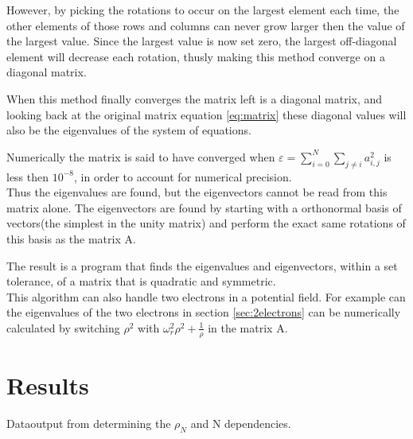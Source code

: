 \documentclass[11pt,a4paper,notitlepage]{article}
\begin{document}
However, by picking the rotations to occur on the largest element each time,
the other elements of those rows and columns can never grow larger then the value of the largest value. Since the largest value is now set zero, the largest off-diagonal element will decrease each rotation, thusly making this method converge on a diagonal matrix. 

When this method finally converges the matrix left is a diagonal matrix, and looking back at the original matrix equation \eqref{eq:matrix} these diagonal values will also be the eigenvalues of the system of equations.

Numerically the matrix is said to have converged when $\varepsilon = \sum_{i=0}^N \sum_{j\neq i} a_{i,j}^2$ is less then $10^{-8}$, in order to account for numerical precision. \\

Thus the eigenvalues are found, but the eigenvectors cannot be read from this matrix alone. The eigenvectors are found by starting with a orthonormal basis of vectors(the simplest in the unity matrix) and perform the exact same rotations of this basis as the matrix A.

The result is a program that finds the eigenvalues and eigenvectors, within a set tolerance, of a matrix that is quadratic and symmetric. \\

This algorithm can also handle two electrons in a potential field. For example can the eigenvalues of the two electrons in section \ref{sec:2electrons} can be numerically calculated by switching $\rho^2$ with $\omega_r^2\rho^2 + \frac{1}{\rho}$ in the matrix A.

\section{Results} \label{sec:results}
Dataoutput from determining the $\rho_N$ and N dependencies.

\end{document}
